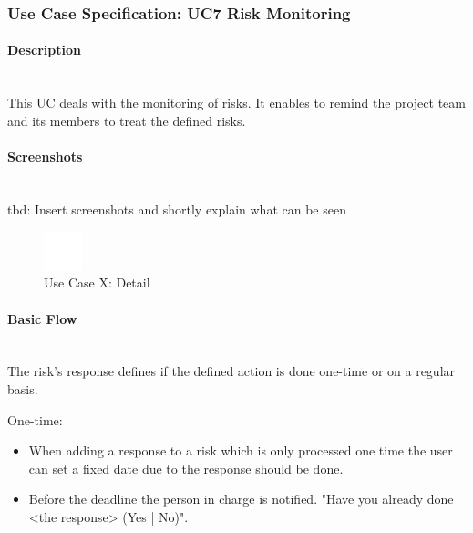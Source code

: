 
\newpage
\subsubsection{Use Case Specification: \ac{UC}7 Risk Monitoring}
\label{sec:domainBbh}

\paragraph*{Description}\mbox{}\\
This \ac{UC} deals with the monitoring of risks. It enables to remind the project team and its members to treat the defined risks.

\paragraph*{Screenshots}\mbox{}\\
tbd: Insert screenshots and shortly explain what can be seen
\begin{figure}[h] 
	\centering
	\includegraphics[width=0.1\textwidth]{Content/Domain/placeholder.png}
	\caption{Use Case X: Detail}
	\label{fig:label7}
\end{figure}

\paragraph*{Basic Flow} \mbox{}\\
\noindent
The risk's response defines if the defined action is done one-time or on a regular basis. 

\noindent
One-time:
\begin{itemize}
	\vspace{-3mm}
	\setlength\itemsep{-1em}
	
	\item When adding a response to a risk which is only processed one time the user can set a fixed date due to the response should be done.
	\item Before the deadline the person in charge is notified. "Have you already done <the response> (Yes | No)".
\end{itemize}

